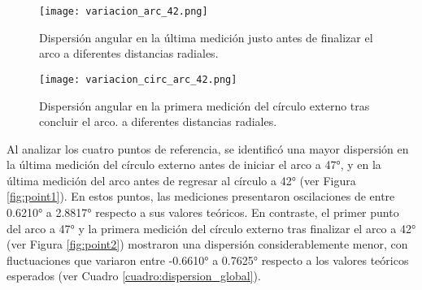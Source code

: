 \begin{figure}[H]
	\centering
	\texttt{[image: variacion\_arc\_42.png]}
	\caption{Dispersión angular en la última medición justo antes de finalizar el arco a diferentes distancias radiales.}
	\label{fig:varianza_arc_42}
\end{figure}

\begin{figure}[H]
	\centering
	\texttt{[image: variacion\_circ\_arc\_42.png]}
	\caption{Dispersión angular en la primera medición del círculo externo tras concluir el arco. a diferentes distancias radiales.}
	\label{fig:varianza_circ_42}
\end{figure}

Al analizar los cuatro puntos de referencia, se identificó una mayor dispersión en la última medición del círculo externo antes de iniciar el arco a 47°, y en la última medición del arco antes de regresar al círculo a 42° (ver Figura \ref{fig:point1}). En estos puntos, las mediciones presentaron oscilaciones de entre 0.6210° a 2.8817° respecto a sus valores teóricos. En contraste, el primer punto del arco a 47° y la primera medición del círculo externo tras finalizar el arco a 42° (ver Figura \ref{fig:point2}) mostraron una dispersión considerablemente menor, con fluctuaciones que variaron entre -0.6610° a 0.7625° respecto a los valores teóricos esperados (ver Cuadro \ref{cuadro:dispersion_global}).

